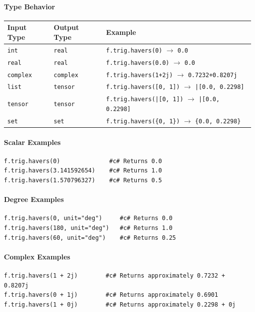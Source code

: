 \paragraph{Type Behavior}
\begin{center}
\begin{tabular}{lll}
\textbf{Input Type} & \textbf{Output Type} & \textbf{Example} \\ \hline
\texttt{int} & \texttt{real} & \texttt{f.trig.havers(0)} $\to$ \texttt{0.0} \\
\texttt{real} & \texttt{real} & \texttt{f.trig.havers(0.0)} $\to$ \texttt{0.0} \\
\texttt{complex} & \texttt{complex} & \texttt{f.trig.havers(1+2j)} $\to$ \texttt{0.7232+0.8207j} \\
\texttt{list} & \texttt{tensor} & \texttt{f.trig.havers([0, 1])} $\to$ \texttt{|[0.0, 0.2298]} \\
\texttt{tensor} & \texttt{tensor} & \texttt{f.trig.havers(|[0, 1])} $\to$ \texttt{|[0.0, 0.2298]} \\
\texttt{set} & \texttt{set} & \texttt{f.trig.havers(\{0, 1\})} $\to$ \texttt{\{0.0, 0.2298\}} \\
\end{tabular}
\end{center}

\paragraph{Scalar Examples}
\begin{verbatim}
f.trig.havers(0)              #c# Returns 0.0
f.trig.havers(3.141592654)    #c# Returns 1.0
f.trig.havers(1.570796327)    #c# Returns 0.5
\end{verbatim}

\paragraph{Degree Examples}
\begin{verbatim}
f.trig.havers(0, unit="deg")     #c# Returns 0.0
f.trig.havers(180, unit="deg")   #c# Returns 1.0
f.trig.havers(60, unit="deg")    #c# Returns 0.25
\end{verbatim}

\paragraph{Complex Examples}
\begin{verbatim}
f.trig.havers(1 + 2j)        #c# Returns approximately 0.7232 + 0.8207j
f.trig.havers(0 + 1j)        #c# Returns approximately 0.6901
f.trig.havers(1 + 0j)        #c# Returns approximately 0.2298 + 0j
\end{verbatim}

